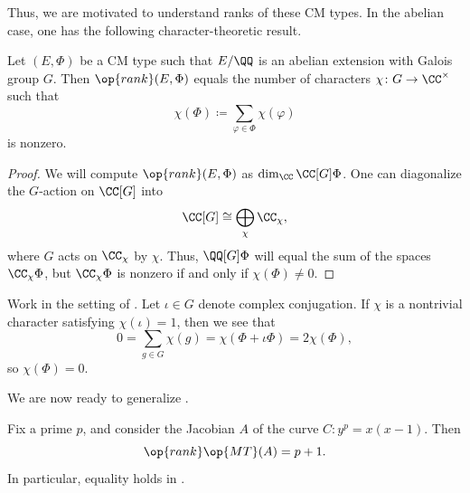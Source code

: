 \documentclass{article}
\begin{document}
Thus, we are motivated to understand ranks of these CM types. In the abelian case, one has the following character-theoretic result.
\begin{lemma} \label{lem:rank-cm-type-character}
	Let $(E,\Phi)$ be a CM type such that $E/\QQ$ is an abelian extension with Galois group $G$. Then $\op{rank}(E,\Phi)$ equals the number of characters $\chi\colon G\to\CC^\times$ such that
	\[\chi(\Phi)\coloneqq\sum_{\varphi\in\Phi}\chi(\varphi)\]
	is nonzero.
\end{lemma}
\begin{proof}
	We will compute $\op{rank}(E,\Phi)$ as $\dim_\CC\CC[G]\Phi$. One can diagonalize the $G$-action on $\CC[G]$ into
	\[\CC[G]\cong\bigoplus_\chi\CC_\chi,\]
	where $G$ acts on $\CC_\chi$ by $\chi$. Thus, $\QQ[G]\Phi$ will equal the sum of the spaces $\CC_\chi\Phi$, but $\CC_\chi\Phi$ is nonzero if and only if $\chi(\Phi)\ne0$.
\end{proof}
\begin{remark} \label{rem:rank-cm-even-character}
	Work in the setting of . Let $\iota\in G$ denote complex conjugation. If $\chi$ is a nontrivial character satisfying $\chi(\iota)=1$, then we see that
	\[0=\sum_{g\in G}\chi(g)=\chi(\Phi+\iota\Phi)=2\chi(\Phi),\]
	so $\chi(\Phi)=0$.
\end{remark}
We are now ready to generalize .
\begin{theorem}
	Fix a prime $p$, and consider the Jacobian $A$ of the curve $C\colon y^p=x(x-1)$. Then
	\[\op{rank}\op{MT}(A)=p+1.\]
	In particular, equality holds in .
\end{theorem}
\end{document}
